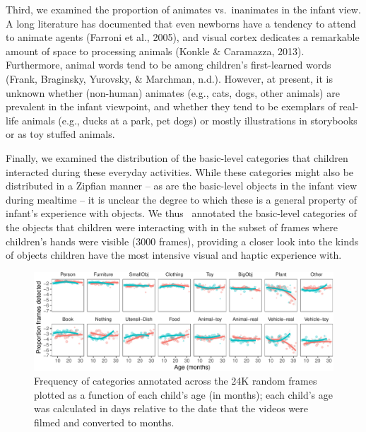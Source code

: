 \documentclass[10pt, letterpaper]{article}
\newenvironment{CodeChunk}{}{}
\begin{document}
Third, we examined the proportion of animates vs.~inanimates in the
infant view. A long literature has documented that even newborns have a
tendency to attend to animate agents (Farroni et al., 2005), and visual
cortex dedicates a remarkable amount of space to processing animals
(Konkle \& Caramazza, 2013). Furthermore, animal words tend to be among
children's first-learned words (Frank, Braginsky, Yurovsky, \& Marchman,
n.d.). However, at present, it is unknown whether (non-human) animates
(e.g., cats, dogs, other animals) are prevalent in the infant viewpoint,
and whether they tend to be exemplars of real-life animals (e.g., ducks
at a park, pet dogs) or mostly illustrations in storybooks or as toy
stuffed animals.

Finally, we examined the distribution of the basic-level categories that
children interacted during these everyday activities. While these
categories might also be distributed in a Zipfian manner -- as are the
basic-level objects in the infant view during mealtime -- it is unclear
the degree to which these is a general property of infant's experience
with objects. We thus ~annotated the basic-level categories of the
objects that children were interacting with in the subset of frames
where children's hands were visible (3000 frames), providing a closer
look into the kinds of objects children have the most intensive visual
and haptic experience with.

\begin{CodeChunk}
\begin{figure}[h]

{\centering \includegraphics{figs/freq_by_category-1} 

}

\caption[Frequency of categories annotated across the 24K random frames plotted as a function of each child's age (in months)]{Frequency of categories annotated across the 24K random frames plotted as a function of each child's age (in months); each child's age was calculated in days relative to the date that the videos were filmed and converted to months.}\label{fig:freq_by_category}
\end{figure}
\end{CodeChunk}
\end{document}
